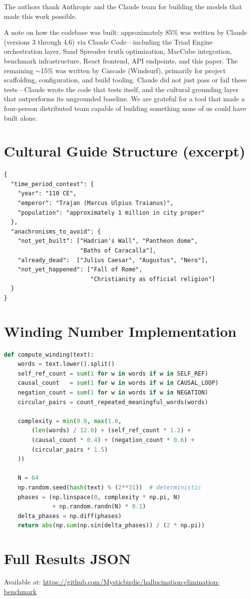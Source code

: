 \documentclass[11pt,a4paper]{article}
\begin{document}
The authors thank Anthropic and the Claude team for building the models that
made this work possible.

A note on how the codebase was built: approximately 85\% was written by
Claude (versions 3 through 4.6) via Claude Code---including the Triad Engine
orchestration layer, Sand Spreader truth optimization, MacCube integration,
benchmark infrastructure, React frontend, API endpoints, and this paper. The
remaining $\sim$15\% was written by Cascade (Windsurf), primarily for project
scaffolding, configuration, and build tooling. Claude did not just pass or
fail these tests---Claude wrote the code that tests itself, and the cultural
grounding layer that outperforms its ungrounded baseline. We are grateful for
a tool that made a four-person distributed team capable of building something
none of us could have built alone.

\appendix

\section{Cultural Guide Structure (excerpt)}

\begin{lstlisting}[language={}]
{
  "time_period_context": {
    "year": "110 CE",
    "emperor": "Trajan (Marcus Ulpius Traianus)",
    "population": "approximately 1 million in city proper"
  },
  "anachronisms_to_avoid": {
    "not_yet_built": ["Hadrian's Wall", "Pantheon dome",
                      "Baths of Caracalla"],
    "already_dead":  ["Julius Caesar", "Augustus", "Nero"],
    "not_yet_happened": ["Fall of Rome",
                         "Christianity as official religion"]
  }
}
\end{lstlisting}

\section{Winding Number Implementation}

\begin{lstlisting}[language=Python]
def compute_winding(text):
    words = text.lower().split()
    self_ref_count = sum(1 for w in words if w in SELF_REF)
    causal_count   = sum(1 for w in words if w in CAUSAL_LOOP)
    negation_count = sum(1 for w in words if w in NEGATION)
    circular_pairs = count_repeated_meaningful_words(words)

    complexity = min(9.0, max(1.0,
        (len(words) / 12.0) + (self_ref_count * 1.2) +
        (causal_count * 0.4) + (negation_count * 0.6) +
        (circular_pairs * 1.5)
    ))

    N = 64
    np.random.seed(hash(text) % (2**31))  # deterministic
    phases = (np.linspace(0, complexity * np.pi, N)
              + np.random.randn(N) * 0.1)
    delta_phases = np.diff(phases)
    return abs(np.sum(np.sin(delta_phases)) / (2 * np.pi))
\end{lstlisting}

\section{Full Results JSON}

Available at:
\url{https://github.com/Mysticbirdie/hallucination-elimination-benchmark}



\end{document}
